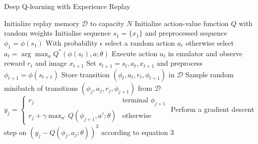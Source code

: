 \begin{algorithm}[H]
\caption{Deep Q-learning with Experience Replay}
\label{algo: deep_q_learning}
\begin{algorithmic}[1]
\State Initialize replay memory $\mathcal{D}$ to capacity $N$
\State Initialize action-value function $Q$ with random weights
    \State Initialise sequence $s_1 = \{ x_1 \}$ and preprocessed \Statex \quad \quad sequence $\phi_1 = \phi(s_1)$
        \State With probability $\epsilon$ select a random action $a_t$
        \State otherwise select $a_t = \arg\max_a Q^*(\phi(s_t), a; \theta)$
        \State Execute action $a_t$ in emulator and observe \Statex \quad \quad \quad reward $r_t$ and image $x_{t+1}$
        \State Set $s_{t+1} = s_t, a_t, x_{t+1}$ and \Statex \quad \quad \quad preprocess $\phi_{t+1} = \phi(s_{t+1})$
        \State Store transition $(\phi_t, a_t, r_t, \phi_{t+1})$ in $\mathcal{D}$
        \State Sample random minibatch of transitions \Statex \qquad \quad $(\phi_j, a_j, r_j, \phi_{j+1})$ from $\mathcal{D}$
        \State $y_j = \begin{cases} 
        r_j & \text{terminal } \phi_{j+1} \\
        r_j + \gamma \max_{a'} Q(\phi_{j+1}, a'; \theta) & \text{otherwise}
        \end{cases}$
        \State Perform a gradient descent step on \Statex \qquad \quad $(y_j - Q(\phi_j, a_j; \theta))^2$ according to equation 3
    \EndFor
\EndFor
\end{algorithmic}
\end{algorithm}

\begin{comment}
The DQN algorithm was tested on seven Atari games: Beam Rider, Breakout, Enduro, Pong, Q*bert, Seaquest, and Space Invaders. In all seven games, the same architecture and hyperparameters were used. In order to limit the error scale, rewards were clipped. Furthermore, the RMSProp algorithm with minibatches of size $32$ was employed. The $\epsilon$-greedy policy strikes a balance between exploration and exploitation. The stability of the training process was demonstrated by the tracking of the average maximum predicted action-value function $Q$ throughout the training period. \cite{mnih2013playingatarideepreinforcement}
\end{comment}

